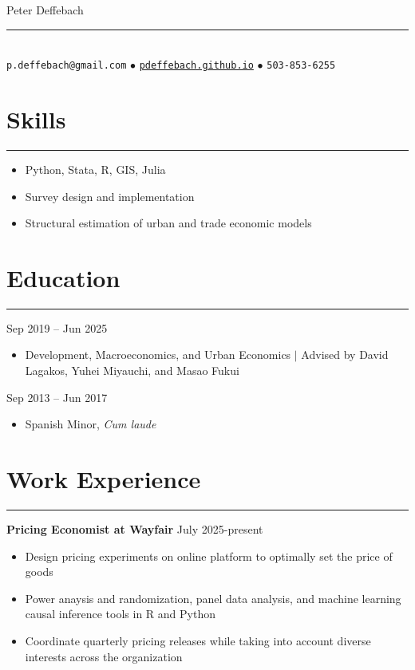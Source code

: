 \documentclass[10pt]{article}
\newenvironment{customitemize}
{ \begin{itemize}[leftmargin=\parindent, topsep = 0.2pt, itemsep = -3pt] }
{\end{itemize} }
\begin{document}
\normalsize
\singlespacing
\thispagestyle{empty}

\begin{center}
{\Large  Peter Deffebach} \\ 
\vspace{-5pt}
\rule{3in}{1pt} \\
\texttt{p.deffebach@gmail.com} $\bullet$ \href{https://pdeffebach.github.io/}{\texttt{pdeffebach.github.io}} $\bullet$ \texttt{503-853-6255}  \\
\end{center} 

\vspace{-12pt}
\section*{Skills}
\noindent \rule{\textwidth}{1pt} 
\begin{customitemize}
	\item Python, Stata, R, GIS, Julia
	\item Survey design and implementation
	\item Structural estimation of urban and trade economic models
\end{customitemize}

\section*{Education}
\noindent \rule{\textwidth}{1pt} 
  \hfill Sep 2019 -- Jun 2025
\begin{customitemize}
	\item Development, Macroeconomics, and Urban Economics $\big |$ Advised by David Lagakos, Yuhei Miyauchi, and Masao Fukui
\end{customitemize}
  \hfill Sep 2013 -- Jun 2017
\begin{customitemize}
	\item Spanish Minor, \textit{Cum laude}
\end{customitemize}

\section*{Work Experience} 
\noindent \rule{\textwidth}{1pt} 
\noindent \textbf{Pricing Economist at Wayfair}  \hfill July 2025-present
\begin{customitemize}
	\item Design pricing experiments on online platform to optimally set the price of goods
	\item Power anaysis and randomization, panel data analysis, and machine learning causal inference tools in R and Python
	\item Coordinate quarterly pricing releases while taking into account diverse interests across the organization
\end{customitemize}
\end{document}
